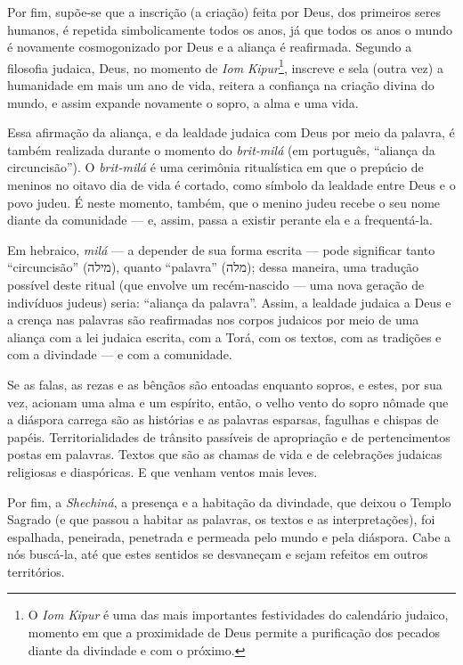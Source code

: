 Por fim, supõe-se que a inscrição (a criação) feita por Deus, dos
primeiros seres humanos, é repetida simbolicamente todos os anos, já que
todos os anos o mundo é novamente cosmogonizado por Deus e a aliança é
reafirmada. Segundo a filosofia judaica, Deus, no momento de \emph{Iom
Kipur}\footnote{O \emph{Iom Kipur} é uma das mais importantes
  festividades do calendário judaico, momento em que a proximidade de
  Deus permite a purificação dos pecados diante da divindade e com o
  próximo.}, inscreve e sela (outra vez) a humanidade em mais um ano de
vida, reitera a confiança na criação divina do mundo, e assim expande
novamente o sopro, a alma e uma vida.

Essa afirmação da aliança, e da lealdade judaica com Deus por meio da
palavra, é também realizada durante o momento do \emph{brit-milá} (em
português, ``aliança da circuncisão''). O \emph{brit-milá} é uma
cerimônia ritualística em que o prepúcio de meninos no oitavo dia de
vida é cortado, como símbolo da lealdade entre Deus e o povo judeu. É
neste momento, também, que o menino judeu recebe o seu nome diante da
comunidade --- e, assim, passa a existir perante ela e a frequentá-la.

Em hebraico, \emph{milá} --- a depender de sua forma escrita --- pode
significar tanto ``circuncisão'' ({מילה}), quanto ``palavra''
({מלה}); dessa maneira, uma tradução possível deste ritual (que
envolve um recém-nascido --- uma nova geração de indivíduos judeus)
seria: ``aliança da palavra''. Assim, a lealdade judaica a Deus e a
crença nas palavras são reafirmadas nos corpos judaicos por meio de uma
aliança com a lei judaica escrita, com a Torá, com os textos, com
as tradições e com a divindade --- e com a comunidade.

Se as falas, as rezas e as bênçãos são entoadas enquanto sopros, e
estes, por sua vez, acionam uma alma e um espírito, então, o velho vento
do sopro nômade que a diáspora carrega são as histórias e as palavras
esparsas, fagulhas e chispas de papéis. Territorialidades de trânsito
passíveis de apropriação e de pertencimentos postas em palavras. Textos
que são as chamas de vida e de celebrações judaicas religiosas e
diaspóricas. E que venham ventos mais leves.

Por fim, a \emph{Shechiná}, a presença e a habitação da divindade, que
deixou o Templo Sagrado (e que passou a habitar as palavras, os textos e
as interpretações), foi espalhada, peneirada, penetrada e permeada pelo
mundo e pela diáspora. Cabe a nós buscá-la, até que estes sentidos se
desvaneçam e sejam refeitos em outros territórios.

